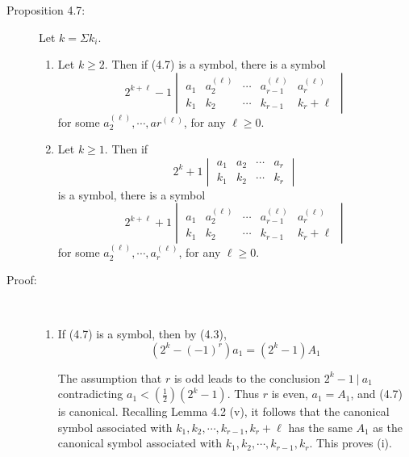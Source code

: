 \begin{description}
  \item[Proposition 4.7:] Let $k = \Sigma k_{i}$.
    \begin{enumerate}[\hspace{1cm}(i)]
      \item Let $k \geq 2$. Then if (4.7) is a symbol, there is a symbol
        \begin{equation}
        2^{k+\ell}-1 \begin{vmatrix}
        a_{1} & a_{2}^{(\ell)} & \cdots & a_{r-1}^{(\ell)} & a_{r}^{(\ell)} \\
        k_{1} & k_{2}          & \cdots & k_{r-1}          & k_{r}+\ell 
        \end{vmatrix}  \tag{4.8-}
        \end{equation}
        for some $a_{2}^{(\ell)}, \cdots, ar^{(\ell)}$, for any $\ell \geq 0$.
      \item Let $k \geq 1$. Then if
        \begin{equation*}
        2^{k}+1 \begin{vmatrix}
        a_{1} & a_{2} & \cdots & a_{r} \\
        k_{1} & k_{2} & \cdots & k_{r}
        \end{vmatrix} 
        \end{equation*}
        is a symbol, there is a symbol
        \begin{equation}
        2^{k+\ell}+1 \begin{vmatrix}
        a_{1} & a_{2}^{(\ell)} & \cdots & a_{r-1}^{(\ell)} & a_{r}^{(\ell)} \\
        k_{1} & k_{2}          & \cdots & k_{r-1}          & k_{r}+\ell 
        \end{vmatrix}  \tag{4.8+}
        \end{equation}
        for some $a_{2}^{(\ell)}, \cdots, a_{r}^{(\ell)}$, for any $\ell \geq 0$.
    \end{enumerate}

  \item[Proof:] $\ $
    \begin{enumerate}[\hspace{1cm}(i)]
      \item If (4.7) is a symbol, then by (4.3),
        \begin{equation}
        (2^{k}-(-1)^{r}) a_{1} = (2^{k}-1) A_{1}
        \end{equation}

        The assumption that $r$ is odd leads to the conclusion $2^{k}-1\ |\ a_{1}$ contradicting $a_{1} < \left( \frac{1}{2} \right) (2^{k}-1)$. Thus $r$ is even, $a_{1} = A_{1}$, and (4.7) is canonical. Recalling Lemma 4.2 (v), it follows that the canonical symbol associated with $k_{1}, k_{2}, \cdots, k_{r-1}, k_{r}+\ell$ has the same $A_{1}$ as the canonical symbol associated with $k_{1}, k_{2}, \cdots, k_{r-1}, k_{r}$. This proves (i).


\end{enumerate}
\end{description}
